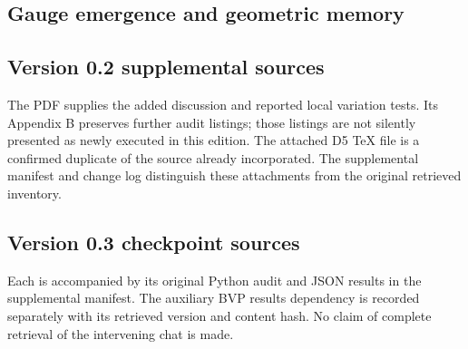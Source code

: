 \documentclass[11pt,oneside]{report}
\begin{document}
\subsection{Gauge emergence and geometric memory}
\noindent{}\par
\noindent{}\par
\noindent{}\par
\noindent{}\par
\noindent{}\par
\subsection{Version 0.2 supplemental sources}
\noindent{}\par
\noindent{}\par
The PDF supplies the added discussion and reported local variation tests. Its Appendix B preserves further audit listings; those listings are not silently presented as newly executed in this edition. The attached D5 TeX file is a confirmed duplicate of the source already incorporated. The supplemental manifest and change log distinguish these attachments from the original retrieved inventory.

\subsection{Version 0.3 checkpoint sources}
\noindent{}\par
\noindent{}\par
\noindent{}\par
Each is accompanied by its original Python audit and JSON results in the supplemental manifest. The auxiliary BVP results dependency is recorded separately with its retrieved version and content hash. No claim of complete retrieval of the intervening chat is made.
\end{document}
